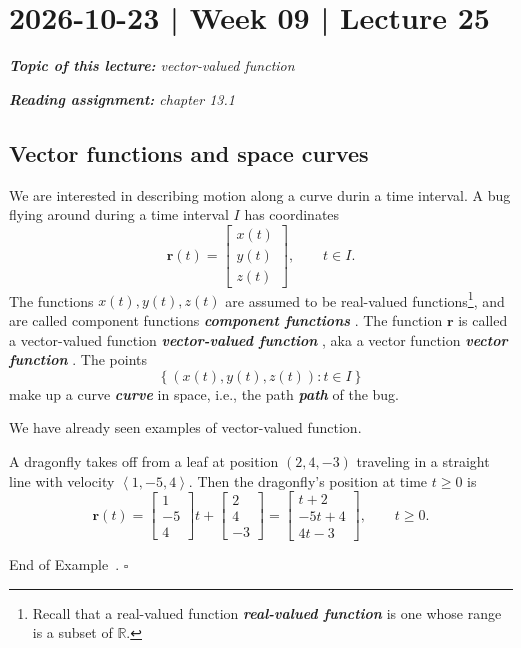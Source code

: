 \documentclass[10pt]{article}
\DeclareRobustCommand{\demph}[1]{%
  \ifmmode
  {\color{Blue}#1}%
  \else
  {\color{Blue}\bfseries\slshape #1}%
  \fi
}
\theoremstyle{definition}
\newtheorem{example}[theorem]{Example}
\renewenvironment{example}
{\begin{oldexample}}
  {\par\smallskip\hfill   End of Example~\theexample. $\square$    \par\end{oldexample}}
\newcommand{\1}[1]{\textbf{1}_{\left[#1\right]}} %
\def\R{\mathbb{R}} %
\begin{document}
\newpage
\section{2026-10-23 | Week 09 | Lecture 25}
\begin{center}
  \begin{tcolorbox}[width=0.9\textwidth, colback=white, colframe=black]
    \textit{\textbf{Topic of this lecture:} vector-valued function}

    \textit{\textbf{Reading assignment:} chapter 13.1}
  \end{tcolorbox}
\end{center}


\subsection{Vector functions and space curves}

We are interested in describing motion along a curve durin a time interval.
 A bug flying around during a time interval $I$ has coordinates
\begin{equation*}
  \boldsymbol{r}(t) =
  \begin{bmatrix}
    x(t)\\y(t)\\z(t)
  \end{bmatrix}, \qquad t\in I.
\end{equation*}
The functions $x(t),y(t),z(t)$ are assumed to be real-valued functions\footnote{Recall that a \demph{real-valued function} is one whose range is a subset of
  $\R$.}, and
are called \demph{component functions}. The function $\boldsymbol{r}$ is
called a \demph{vector-valued function}, aka a \demph{vector function}. The
points
\begin{equation*}
  \left\{(x(t),y(t),z(t)): t\in I\right\} 
\end{equation*}
make up a \demph{curve} in space, i.e., the \demph{path} of the bug.

We have already seen examples of vector-valued function.
\begin{example}[A vector-valued function]
  A dragonfly takes off from a leaf at position $(2,4,-3)$ traveling in a
  straight line with velocity $\left\langle 1,-5,4 \right\rangle$. Then the
  dragonfly's position at time $t \geq 0$ is
  \begin{equation*}
    \boldsymbol{r}(t) =
    \begin{bmatrix}
      1\\-5\\4
    \end{bmatrix}t
    +
    \begin{bmatrix}
      2\\4\\-3
    \end{bmatrix}
    =
    \begin{bmatrix}
      t+2\\-5t+4\\4t-3
    \end{bmatrix},
    \qquad t \geq 0.
  \end{equation*}
\end{example}
\end{document}
